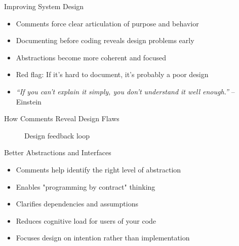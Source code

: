 
\begin{frame}{Improving System Design}
	\begin{itemize}
		\item Comments force clear articulation of purpose and behavior
		\item Documenting before coding reveals design problems early
		\item Abstractions become more coherent and focused
		\item Red flag: If it's hard to document, it's probably a poor design
		\item \textit{``If you can't explain it simply, you don't understand it well enough.''} -- Einstein
		
	\end{itemize}
\end{frame}

\begin{frame}{How Comments Reveal Design Flaws}
	\centering
	\begin{figure}
		
	
	\caption{Design feedback loop}
	\label{fig:design-loop}
\end{figure}
\end{frame}

\begin{frame}{Better Abstractions and Interfaces}
	\begin{itemize}
		\item Comments help identify the right level of abstraction
		\item Enables "programming by contract" thinking
		\item Clarifies dependencies and assumptions
		\item Reduces cognitive load for users of your code
		\item Focuses design on intention rather than implementation
	\end{itemize}
\end{frame}

